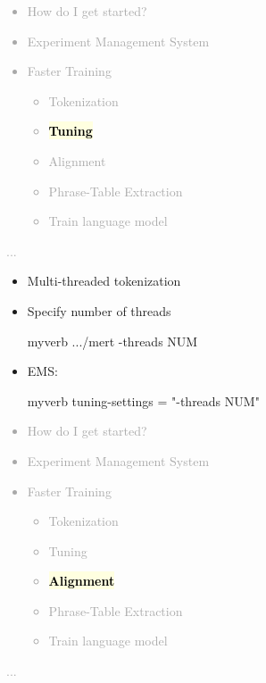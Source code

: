 \documentclass[landscape]{uedslides2C}
\newcommand{\currenttopic}[1]{\colorbox{lightyellow}{\textcolor{black}{\bf #1}}}
\begin{document}

\vspace{-5mm}
\textcolor{darkgrey}{
\begin{itemize} \itemsep -1mm
\item {How do I get started?}
\item {Experiment Management System}
\item {Faster Training}
  \begin{itemize}
  \item {Tokenization}
  \item \currenttopic{Tuning}
  \item Alignment
  \item Phrase-Table Extraction
  \item Train language model
  \end{itemize}
\end{itemize}
...
}


\vspace{10mm}
\begin{itemize} \itemsep 10mm
\item Multi-threaded tokenization

\item {Specify number of threads}\\[4mm]
\begin{SaveVerbatim}{myverb} 
  .../mert -threads NUM
\end{SaveVerbatim}
\colorbox{gray}{}

\item EMS:\\[4mm]
\begin{SaveVerbatim}{myverb} 
  tuning-settings = "-threads NUM" 
\end{SaveVerbatim}
\colorbox{gray}{}

\end{itemize}



\vspace{-5mm}
\textcolor{darkgrey}{
\begin{itemize} \itemsep -1mm
\item {How do I get started?}
\item {Experiment Management System}
\item {Faster Training}
  \begin{itemize}
  \item {Tokenization}
  \item {Tuning}
  \item \currenttopic{Alignment}
  \item Phrase-Table Extraction
  \item Train language model
  \end{itemize}
\end{itemize}
...
}
\end{document}
